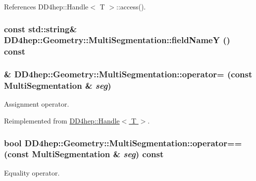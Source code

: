 References DD4hep::Handle$<$ T $>$::access().\hypertarget{class_d_d4hep_1_1_geometry_1_1_multi_segmentation_a87968a8c0890db6aee6251792a764bc8}{
\subsubsection[{fieldNameY}]{\setlength{\rightskip}{0pt plus 5cm}const std::string\& DD4hep::Geometry::MultiSegmentation::fieldNameY () const}}
\label{class_d_d4hep_1_1_geometry_1_1_multi_segmentation_a87968a8c0890db6aee6251792a764bc8}
\hypertarget{class_d_d4hep_1_1_geometry_1_1_multi_segmentation_a71f8f2f78a2f3054f67c4aff149c6137}{
\subsubsection[{operator=}]{\& DD4hep::Geometry::MultiSegmentation::operator= (const {\bf MultiSegmentation} \& {\em seg})}}
\label{class_d_d4hep_1_1_geometry_1_1_multi_segmentation_a71f8f2f78a2f3054f67c4aff149c6137}


Assignment operator. 

Reimplemented from \hyperlink{class_d_d4hep_1_1_handle_a9bbf8f498df42e81ad26fb00233505a6}{DD4hep::Handle$<$ T $>$}.\hypertarget{class_d_d4hep_1_1_geometry_1_1_multi_segmentation_a4c49fe036eda4b83a03ae28bd2592b6f}{
\subsubsection[{operator==}]{\setlength{\rightskip}{0pt plus 5cm}bool DD4hep::Geometry::MultiSegmentation::operator== (const {\bf MultiSegmentation} \& {\em seg}) const}}
\label{class_d_d4hep_1_1_geometry_1_1_multi_segmentation_a4c49fe036eda4b83a03ae28bd2592b6f}


Equality operator. 


